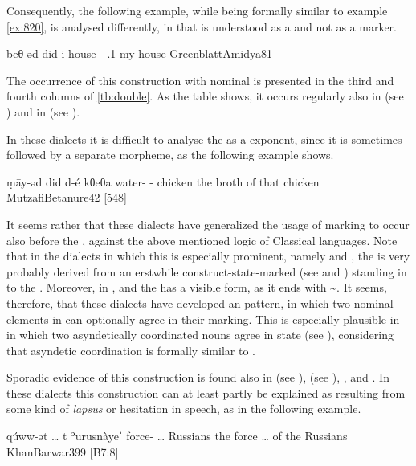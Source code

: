 Consequently, the following example, while being formally similar to example \ref{ex:820}, is analysed differently, in that  is understood as a \lnk* and not as a \gen* marker.

{beθ-əd did-i}
{house-\cst{} \lnk-\poss.1\sg}
{my house}
{GreenblattAmidya}{81}


The occurrence of this construction with nominal \secns is presented in the third and fourth columns of \ref{tb:double}. As the table shows, it occurs  regularly also in \JUrm (see ) and in \Koy (see ).


In these dialects it is difficult to analyse the \lnk* as a \gen* exponent, since it is sometimes followed by a separate \gen* morpheme, as the following example shows.

{ṃāy-əd did d-é\cb{} kθeθa}
{water-\cst{} \lnk{} \gen-\dem\cb{} chicken}
{the broth of that chicken}
{MutzafiBetanure}{42 {[548]}}

It seems rather that these dialects  have generalized the usage of \cst* marking to occur also before the \lnk*, against the above mentioned logic of Classical  languages. Note that in the dialects in which this is especially prominent, namely \JUrm and \Koy, the \lnk* is very probably derived from an erstwhile construct-state-marked \dem* (see  and ) standing in  to the \prim. Moreover, in \Amd, \Betn and \Koy  the \lnk* has a visible \cst* form, as it ends with \~. It seems, therefore, that these dialects have developed an  pattern, in which two nominal elements in  can optionally agree in their \cst* marking. This is especially plausible in \JUrm in which  two asyndetically coordinated nouns agree in state (see ), considering that asyndetic coordination is formally similar to .




Sporadic evidence of this construction is found also in \Arb (see ),  \Qar (see ), \Alq, and \Barw. In these dialects this construction can at least partly be explained as resulting from some kind of \emph{lapsus} or hesitation in speech, as in the following example.

{qúww-ət \ldots{} t\cb{} ʾurusnàyeˈ}
{force-\cst{} \ldots{} \lnk\cb{} Russians}
{the force \ldots{} of the Russians}
{KhanBarwar}{399 {[B7:8]}}

